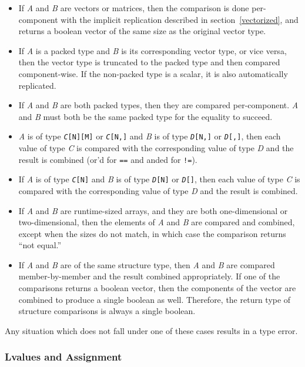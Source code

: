 \documentclass[11pt]{article}
\newcommand{\code}[1]{\texttt{#1}}
\begin{document}
\begin{itemize}
	\item If \textit{A} and \textit{B} are vectors or matrices, then the comparison is done per-component with the implicit replication described in section~\ref{vectorized}, and returns a boolean vector of the same size as the original vector type.
	\item If \textit{A} is a packed type and \textit{B} is its corresponding vector type, or vice versa, then the vector type is truncated to the packed type and then compared component-wise. If the non-packed type is a scalar, it is also automatically replicated.
	\item If \textit{A} and \textit{B} are both packed types, then they are compared per-component. \textit{A} and \textit{B} must both be the same packed type for the equality to succeed.
	\item \textit{A} is of type \code{\textit{C}[N][M]} or \code{\textit{C}[N,]} and \textit{B} is of type \code{\textit{D}[N,]} or \code{\textit{D}[,]}, then each value of type \textit{C} is compared with the corresponding value of type \textit{D} and the result is combined (or'd for \code{==} and anded for \code{!=}).
	\item If \textit{A} is of type \code{\textit{C}[N]} and \textit{B} is of type \code{\textit{D}[N]} or \code{\textit{D}[]}, then each value of type \textit{C} is compared with the corresponding value of type \textit{D} and the result is combined.
	\item If \textit{A} and \textit{B} are runtime-sized arrays, and they are both one-dimensional or two-dimensional, then the elements of \textit{A} and \textit{B} are compared and combined, except when the sizes do not match, in which case the comparison returns ``not equal.''
	\item If \textit{A} and \textit{B} are of the same structure type, then \textit{A} and \textit{B} are compared member-by-member and the result combined appropriately. If one of the comparisons returns a boolean vector, then the components of the vector are combined to produce a single boolean as well. Therefore, the return type of structure comparisons is always a single boolean.
\end{itemize}

Any situation which does not fall under one of these cases results in a type error.

\subsubsection{Lvalues and Assignment}
\end{document}
